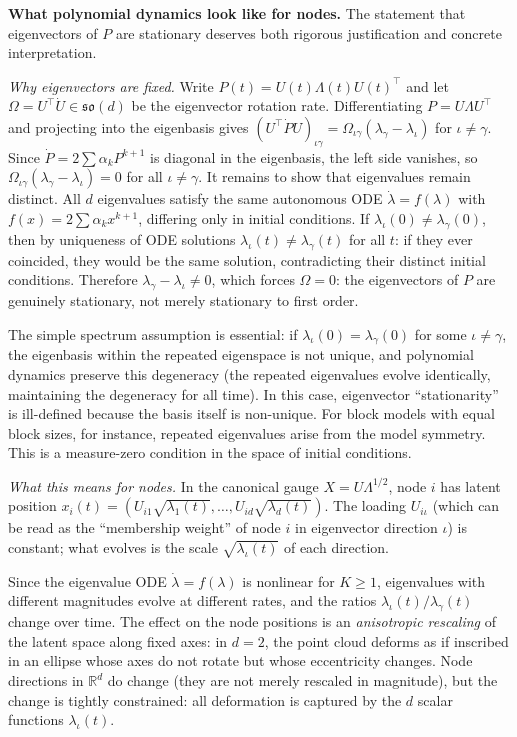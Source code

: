 \documentclass{article}
\newcommand{\RR}{\mathbb{R}}
\newcommand{\so}{\mathfrak{so}}
\theoremstyle{plain}
\theoremstyle{definition}
\theoremstyle{remark}
\begin{document}
\textbf{What polynomial dynamics look like for nodes.}
The statement that eigenvectors of $P$ are stationary deserves both rigorous justification and concrete interpretation.

\emph{Why eigenvectors are fixed.}
Write $P(t) = U(t) \Lambda(t) U(t)^\top$ and let $\Omega = U^\top \dot{U} \in \so(d)$ be the eigenvector rotation rate.
Differentiating $P = U \Lambda U^\top$ and projecting into the eigenbasis gives $(U^\top \dot{P} U)_{\iota\gamma} = \Omega_{\iota\gamma}(\lambda_\gamma - \lambda_\iota)$ for $\iota \neq \gamma$.
Since $\dot{P} = 2 \sum \alpha_k P^{k+1}$ is diagonal in the eigenbasis, the left side vanishes, so $\Omega_{\iota\gamma} (\lambda_\gamma - \lambda_\iota) = 0$ for all $\iota \neq \gamma$.
It remains to show that eigenvalues remain distinct.
All $d$ eigenvalues satisfy the same autonomous ODE $\dot{\lambda} = f(\lambda)$ with $f(x) = 2 \sum \alpha_k x^{k+1}$, differing only in initial conditions.
If $\lambda_\iota(0) \neq \lambda_\gamma(0)$, then by uniqueness of ODE solutions $\lambda_\iota(t) \neq \lambda_\gamma(t)$ for all $t$: if they ever coincided, they would be the same solution, contradicting their distinct initial conditions.
Therefore $\lambda_\gamma - \lambda_\iota \neq 0$, which forces $\Omega = 0$: the eigenvectors of $P$ are genuinely stationary, not merely stationary to first order.

The simple spectrum assumption is essential: if $\lambda_\iota(0) = \lambda_\gamma(0)$ for some $\iota \neq \gamma$, the eigenbasis within the repeated eigenspace is not unique, and polynomial dynamics preserve this degeneracy (the repeated eigenvalues evolve identically, maintaining the degeneracy for all time).
In this case, eigenvector ``stationarity'' is ill-defined because the basis itself is non-unique.
For block models with equal block sizes, for instance, repeated eigenvalues arise from the model symmetry.
This is a measure-zero condition in the space of initial conditions.

\emph{What this means for nodes.}
In the canonical gauge $X = U \Lambda^{1/2}$, node $i$ has latent position $x_i(t) = (U_{i1} \sqrt{\lambda_1(t)}, \ldots, U_{id} \sqrt{\lambda_d(t)})$.
The loading $U_{i\iota}$ (which can be read as the ``membership weight'' of node $i$ in eigenvector direction $\iota$) is constant; what evolves is the scale $\sqrt{\lambda_\iota(t)}$ of each direction.

Since the eigenvalue ODE $\dot{\lambda} = f(\lambda)$ is nonlinear for $K \ge 1$, eigenvalues with different magnitudes evolve at different rates, and the ratios $\lambda_\iota(t) / \lambda_\gamma(t)$ change over time.
The effect on the node positions is an \emph{anisotropic rescaling} of the latent space along fixed axes: in $d = 2$, the point cloud deforms as if inscribed in an ellipse whose axes do not rotate but whose eccentricity changes.
Node directions in $\RR^d$ do change (they are not merely rescaled in magnitude), but the change is tightly constrained: all deformation is captured by the $d$ scalar functions $\lambda_\iota(t)$.
\end{document}
